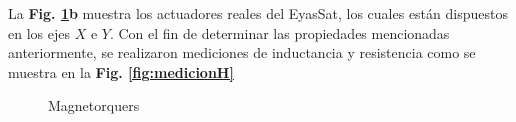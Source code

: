 La \textbf{Fig. \ref{fig:magnetorquers}b} muestra los actuadores reales del EyasSat, los cuales están dispuestos en los ejes $X$ e $Y$. Con el fin de determinar las propiedades mencionadas anteriormente, se realizaron mediciones de inductancia y resistencia como se muestra en la \textbf{Fig. \ref{fig:medicionH}}

\begin{figure}[h!]
	\centering
	
	\caption{Magnetorquers}
	\label{fig:magnetorquers}
\end{figure}

